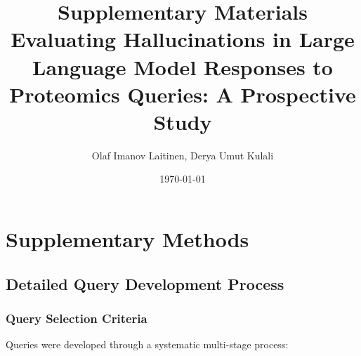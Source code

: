 \documentclass[11pt,a4paper]{article}
\title{\textbf{Supplementary Materials} \\[0.5em]
\large Evaluating Hallucinations in Large Language Model Responses to Proteomics Queries: A Prospective Study}
\author{Olaf Imanov Laitinen, Derya Umut Kulali}
\date{\today}
\begin{document}
\maketitle

\tableofcontents
\newpage

\section{Supplementary Methods}

\subsection{Detailed Query Development Process}

\subsubsection{Query Selection Criteria}

Queries were developed through a systematic multi-stage process:
\end{document}
